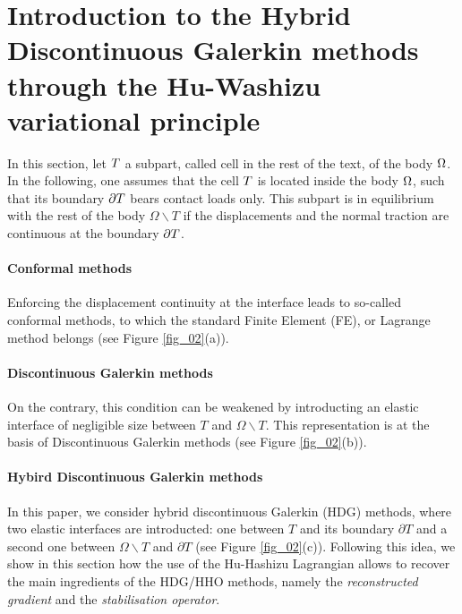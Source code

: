 \section{Introduction to the Hybrid Discontinuous Galerkin methods through the Hu-Washizu variational principle}
\label{sec_composite_demo}

In this section, let $T$ a subpart, called cell in the rest of the
text, of the body \(\Omega\). In the following, one assumes that the
cell $T$ is located inside the body $\Omega{}$, such that its
boundary $\partial T{}$ bears contact loads only. This subpart is in
equilibrium with the rest of the body \(\Omega\backslash T\) if the
displacements and the normal traction are continuous at the boundary
$\partial T{}$.

\paragraph{Conformal methods} Enforcing the displacement continuity at the interface leads to
so-called conformal methods, to which the standard Finite Element (FE), or Lagrange
method belongs (see Figure \ref{fig_02}(a)).

\paragraph{Discontinuous Galerkin methods} On
the contrary, this condition can be weakened by introducting an elastic
interface of negligible size between \(T\) and \(\Omega\backslash T\).
This representation is at the basis of Discontinuous Galerkin methods
(see Figure \ref{fig_02}(b)).

\paragraph{Hybird Discontinuous Galerkin methods} In
this paper, we consider hybrid discontinuous Galerkin (HDG) methods,
where two elastic interfaces are introducted: one between \(T\) and its
boundary \(\partial T\) and a second one between \(\Omega\backslash T\)
and \(\partial T\) (see Figure \ref{fig_02}(c)). Following this idea, we
show in this section how the use of the Hu-Hashizu Lagrangian allows to
recover the main ingredients of the HDG/HHO methods, namely the
\textit{reconstructed gradient} and the \textit{stabilisation operator}.

